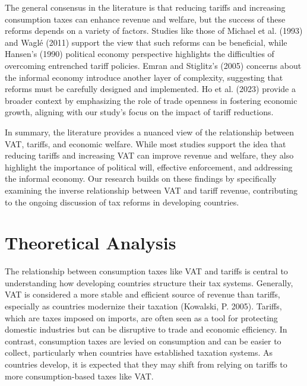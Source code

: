 \documentclass[12pt]{article}
\begin{document}
The general consensus in the literature is that reducing tariffs and increasing consumption taxes can enhance revenue and welfare, but the success of these reforms depends on a variety of factors. Studies like those of Michael et al. (1993) and Waglé (2011) support the view that such reforms can be beneficial, while Hansen’s (1990) political economy perspective highlights the difficulties of overcoming entrenched tariff policies. Emran and Stiglitz’s (2005) concerns about the informal economy introduce another layer of complexity, suggesting that reforms must be carefully designed and implemented. Ho et al. (2023) provide a broader context by emphasizing the role of trade openness in fostering economic growth, aligning with our study’s focus on the impact of tariff reductions.

In summary, the literature provides a nuanced view of the relationship between VAT, tariffs, and economic welfare. While most studies support the idea that reducing tariffs and increasing VAT can improve revenue and welfare, they also highlight the importance of political will, effective enforcement, and addressing the informal economy. Our research builds on these findings by specifically examining the inverse relationship between VAT and tariff revenue, contributing to the ongoing discussion of tax reforms in developing countries.

\section{Theoretical Analysis}
\label{sec:theory}
The relationship between consumption taxes like VAT and tariffs is central to understanding how developing countries structure their tax systems. Generally, VAT is considered a more stable and efficient source of revenue than tariffs, especially as countries modernize their taxation (Kowalski, P. 2005). Tariffs, which are taxes imposed on imports, are often seen as a tool for protecting domestic industries but can be disruptive to trade and economic efficiency. In contrast, consumption taxes are levied on consumption and can be easier to collect, particularly when countries have established taxation systems. As countries develop, it is expected that they may shift from relying on tariffs to more consumption-based taxes like VAT.
\end{document}
